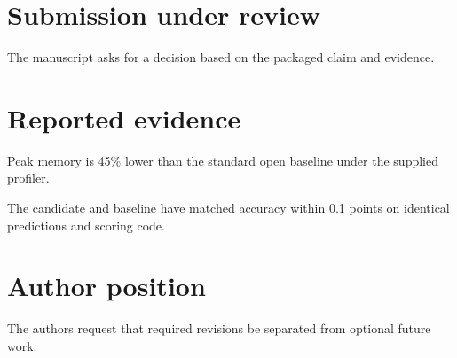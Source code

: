 \documentclass{article}
\begin{document}
\section{Submission under review}
The manuscript asks for a decision based on the packaged claim and evidence.
\section{Reported evidence}
Peak memory is 45\% lower than the standard open baseline under the supplied profiler.

The candidate and baseline have matched accuracy within 0.1 points on identical predictions and scoring code.
\section{Author position}
The authors request that required revisions be separated from optional future work.
\end{document}
